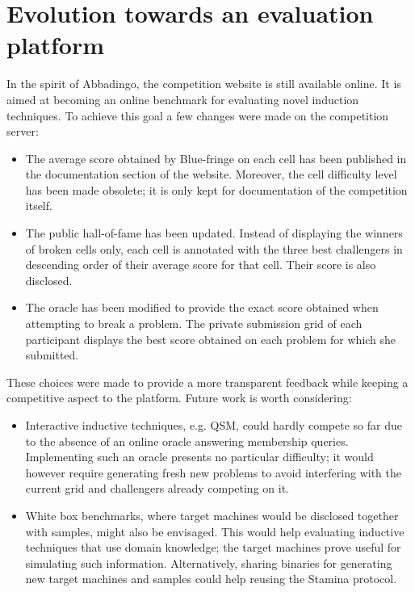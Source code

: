 \section{Evolution towards an evaluation platform\label{section:stamina-platform}}

In the spirit of Abbadingo, the competition website is still available online. It is aimed at becoming an online benchmark for evaluating novel induction techniques. To achieve this goal a few changes were made on the competition server:
\begin{itemize}

\item The average score obtained by Blue-fringe on each cell has been published in the documentation section of the website. Moreover, the cell difficulty level has been made obsolete; it is only kept for documentation of the competition itself.

\item The public hall-of-fame has been updated. Instead of displaying the winners of broken cells only, each cell is annotated with the three best challengers in descending order of their average score for that cell. Their score is also disclosed. 

\item The oracle has been modified to provide the exact score obtained when attempting to break a problem. The private submission grid of each participant displays the best score obtained on each problem for which she submitted. 

\end{itemize}

These choices were made to provide a more transparent feedback while keeping a competitive aspect to the platform. Future work is worth considering:
\begin{itemize}

\item Interactive inductive techniques, e.g. QSM, could hardly compete so far due to the absence of an online oracle answering membership queries. Implementing such an oracle presents no particular difficulty; it would however require generating fresh new problems to avoid interfering with the current grid and challengers already competing on it. 

\item White box benchmarks, where target machines would be disclosed together with samples, might also be envisaged. This would help evaluating inductive techniques that use domain knowledge; the target machines prove useful for simulating such information. Alternatively, sharing binaries for generating new target machines and samples could help reusing the Stamina protocol. 

\end{itemize}


